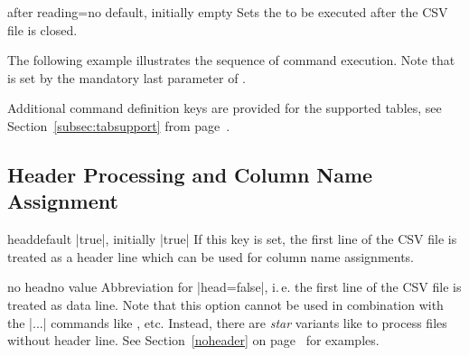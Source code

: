 \documentclass[a4paper,11pt]{ltxdoc}
\begin{document}
\begin{docCsvKey}{after reading}{=}{no default, initially empty}
  Sets the  to be executed after the CSV file is closed.
\end{docCsvKey}

\bigskip

The following example illustrates the sequence of command execution.
Note that  is set by the mandatory last
parameter of .

\begin{dispExample}
%
\end{dispExample}

Additional command definition keys are provided for the supported tables,
see Section~\ref{subsec:tabsupport} from page~\pageref{subsec:tabsupport}.

\clearpage
\subsection{Header Processing and Column Name Assignment}%

\begin{docCsvKey}{head}{}{default |true|, initially |true|}
  If this key is set, the first line of the CSV file is treated as a header
  line which can be used for column name assignments.
\end{docCsvKey}


\begin{docCsvKey}{no head}{}{no value}
  Abbreviation for |head=false|, i.\,e. the first line of the CSV file is
  treated as data line.
  Note that this option cannot be used in combination with
  the |\csvauto...| commands like , etc.
  Instead, there are \emph{star} variants like  to
  process files without header line.
  See Section~\ref{noheader} on page~\pageref{noheader} for examples.
\end{docCsvKey}
\end{document}
